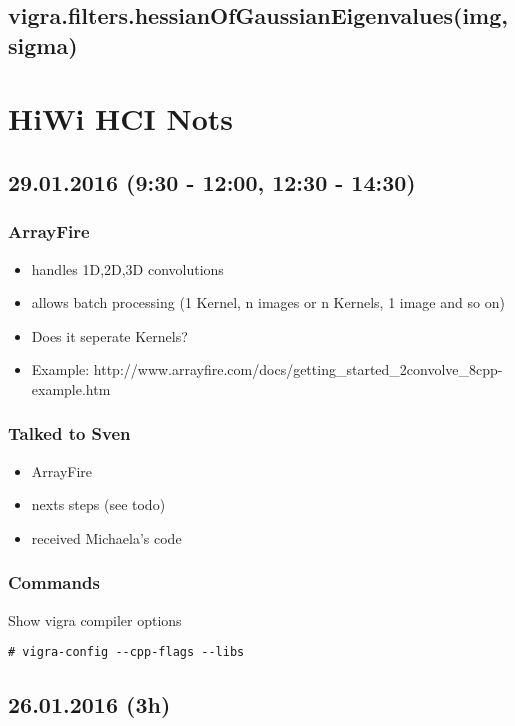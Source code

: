 \documentclass[12pt,a4paper]{article}
\begin{document}
  \subsection{vigra.filters.hessianOfGaussianEigenvalues(img, sigma)}


\section{HiWi HCI Nots}

\subsection{29.01.2016 (9:30 - 12:00, 12:30 - 14:30)}

\subsubsection{ArrayFire}
  \begin{itemize}
    \item handles 1D,2D,3D convolutions
    \item allows batch processing (1 Kernel, n images or n Kernels, 1 image and so on)
    \item Does it seperate Kernels?
    \item Example: http://www.arrayfire.com/docs/getting_started_2convolve_8cpp-example.htm
  \end{itemize}

\subsubsection{Talked to Sven}
  \begin{itemize}
    \item ArrayFire
    \item nexts steps (see todo)
    \item received Michaela's code
  \end{itemize}

\subsubsection{Commands}

  Show vigra compiler options
  \begin{lstlisting}[style=BashInputStyle]
  # vigra-config --cpp-flags --libs 
  \end{lstlisting}

\subsection{26.01.2016 (3h)}
\end{document}
